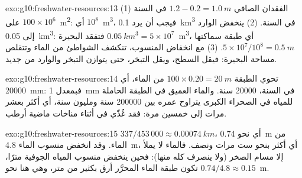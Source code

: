 \begin{solution}{exo:g10:freshwater-resources:13}
(1) الفقدان الصافي $1.2 - 0.2 = \qty{1.0}{m}$ في السنة على
$100 \times 10^6$~\unit{m^2}: أي $10^8$~\unit{m^3}، فيجب أن يرد \qty{0.1}{km^3}
في السنة. (2) ينخفض الوارد إلى \qty{0.05}{km^3}: فتفقد البحيرة
$\qty{0.05}{km^3} = 5 \times 10^7$~\unit{m^3}، أي طبقة سماكتها
$5 \times 10^7/10^8 = \qty{0.5}{m}$. (3) مع انخفاض المنسوب، تنكشف الشواطئ
من الماء وتتقلص مساحة البحيرة: فيقل السطح، ويقل التبخر، حتى يتوازن التبخر
والوارد من جديد.
\end{solution}

\begin{solution}{exo:g10:freshwater-resources:14}
تحوي الطبقة $100 \times 0.20 = \qty{20}{m}$ من الماء، أي
\qty{20000}{mm}: فبمعدل \qty{1}{mm} في السنة، \num{20000} سنة. والماء العميق في
الطبقة الحاملة للمياه في الصحراء الكبرى يتراوح عمره بين \num{200000} سنة ومليون سنة، أي
أكثر بعشر مرات إلى خمسين مرة: فقد غُذّي في أثناء مناخات ماضية أرطب.
\end{solution}

\begin{solution}{exo:g10:freshwater-resources:15}
$337/453\,000 \approx \qty{0.00074}{km}$، أي نحو \qty{0.74}{m} من الماء. وقد انخفض
منسوب الماء \qty{4.8}{m}، أي أكثر بنحو ست مرات ونصف. فالماء لا
يملأ إلا مسام الصخر (ولا ينصرف كله منها): فحين ينخفض منسوب المياه الجوفية مترًا، تكون
طبقة الماء المحرَّر أرق بكثير من متر، وهي هنا نحو $0.74/4.8 \approx \num{0.15}$~m.
\end{solution}

